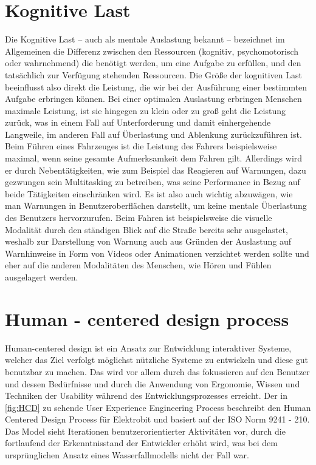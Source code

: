 \section{Kognitive Last}
Die Kognitive Last – auch als mentale Auslastung bekannt – bezeichnet im Allgemeinen die Differenz zwischen den Ressourcen (kognitiv, psychomotorisch oder wahrnehmend) die benötigt werden, um eine Aufgabe zu erfüllen, und den tatsächlich zur Verfügung stehenden Ressourcen. Die Größe der kognitiven Last beeinflusst also direkt die Leistung, die wir bei der Ausführung einer bestimmten Aufgabe erbringen können. Bei einer optimalen Auslastung erbringen Menschen maximale Leistung, ist sie hingegen zu klein oder zu groß geht die Leistung zurück, was in einem Fall auf Unterforderung und damit einhergehende Langweile, im anderen Fall auf Überlastung und Ablenkung zurückzuführen ist\cite{.e}. Beim Führen eines Fahrzeuges ist die Leistung des Fahrers beispielsweise maximal, wenn seine gesamte Aufmerksamkeit dem Fahren gilt. Allerdings wird er durch Nebentätigkeiten, wie zum Beispiel das Reagieren auf Warnungen, dazu gezwungen sein Multitasking zu betreiben, was seine Performance in Bezug auf beide Tätigkeiten einschränken wird. Es ist also auch wichtig abzuwägen, wie man Warnungen in Benutzeroberflächen darstellt, um keine mentale Überlastung des Benutzers hervorzurufen. Beim Fahren ist beispielsweise die visuelle Modalität durch den ständigen Blick auf die Straße bereits sehr ausgelastet, weshalb zur Darstellung von Warnung auch aus Gründen der Auslastung auf Warnhinweise in Form von Videos oder Animationen verzichtet werden sollte und eher auf die anderen Modalitäten des Menschen, wie Hören und Fühlen ausgelagert werden.

\section{Human - centered  design process}
Human-centered design ist ein Ansatz zur Entwicklung interaktiver Systeme, welcher das Ziel verfolgt möglichst nützliche Systeme zu entwickeln und diese gut benutzbar zu machen.
Das wird vor allem durch das fokussieren auf den Benutzer und dessen Bedürfnisse und durch die Anwendung von Ergonomie, Wissen und Techniken der Usability während des Entwicklungsprozesses erreicht\cite{.}.
Der in \cref{fig:HCD} zu sehende User Experience Engineering Process beschreibt den Human Centered Design Process für Elektrobit und basiert auf der ISO Norm 9241 - 210.
Das Model sieht Iterationen benutzerorientierter Aktivitäten vor, durch die fortlaufend der Erkenntnisstand der Entwickler erhöht wird, was bei dem ursprünglichen Ansatz eines Wasserfallmodells nicht der Fall war.

